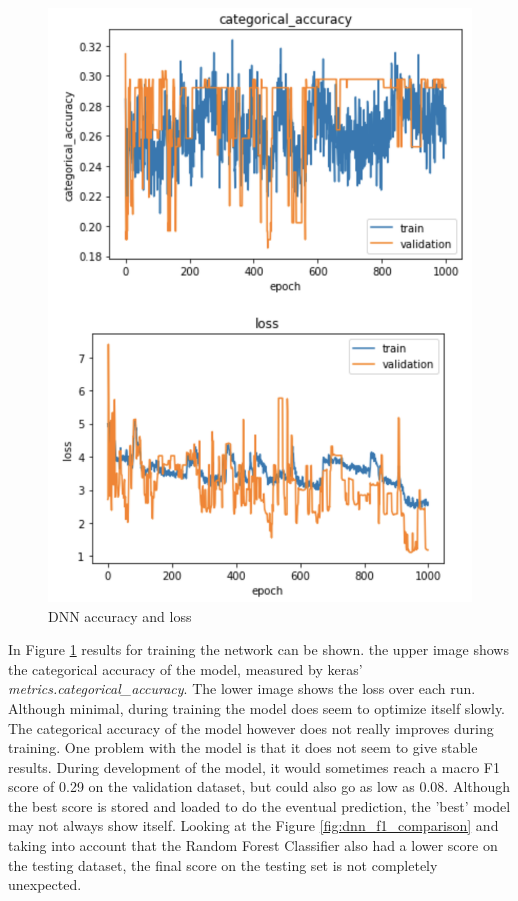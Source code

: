 \documentclass[preprint,12pt]{elsarticle}
\begin{document}
\begin{figure}[!h]
\centering\includegraphics[width=0.8\linewidth]{dnn_measurements}
\caption{DNN accuracy and loss}
\label{fig:dnn_measurements}
\end{figure}

In Figure \ref{fig:dnn_measurements} results for training the network can be shown. the upper image shows the categorical accuracy of the model, measured by keras' \textit{metrics.categorical{\_}accuracy}. The lower image shows the loss over each run. Although minimal, during training the model does seem to optimize itself slowly. The categorical accuracy of the model however does not really improves during training. One problem with the model is that it does not seem to give stable results. During development of the model, it would sometimes reach a macro F1 score of 0.29 on the validation dataset, but could also go as low as 0.08. Although the best score is stored and loaded to do the eventual prediction, the 'best' model may not always show itself. Looking at the Figure \ref{fig:dnn_f1_comparison} and taking into account that the Random Forest Classifier also had a lower score on the testing dataset, the final score on the testing set is not completely unexpected.
\end{document}
